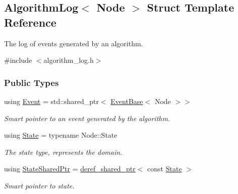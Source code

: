 \hypertarget{structAlgorithmLog}{}\subsection{Algorithm\+Log$<$ Node $>$ Struct Template Reference}
\label{structAlgorithmLog}


The log of events generated by an algorithm.  




{\ttfamily \#include $<$algorithm\+\_\+log.\+h$>$}

\subsubsection*{Public Types}
\begin{DoxyCompactItemize}
\item 
using \hyperlink{structAlgorithmLog_a7e0d48b82e3a6cbe4128c08f936fee9a}{Event} = std\+::shared\+\_\+ptr$<$ \hyperlink{structEventBase}{Event\+Base}$<$ Node $>$$>$\hypertarget{structAlgorithmLog_a7e0d48b82e3a6cbe4128c08f936fee9a}{}\label{structAlgorithmLog_a7e0d48b82e3a6cbe4128c08f936fee9a}

\begin{DoxyCompactList}\small\item\em Smart pointer to an event generated by the algorithm. \end{DoxyCompactList}\item 
using \hyperlink{structAlgorithmLog_a64e28cd23a6e61e991d6826c7c0fe466}{State} = typename Node\+::\+State\hypertarget{structAlgorithmLog_a64e28cd23a6e61e991d6826c7c0fe466}{}\label{structAlgorithmLog_a64e28cd23a6e61e991d6826c7c0fe466}

\begin{DoxyCompactList}\small\item\em The state type, represents the domain. \end{DoxyCompactList}\item 
using \hyperlink{structAlgorithmLog_aa938278830c04450a447beb9ff249b3f}{State\+Shared\+Ptr} = \hyperlink{classderef__shared__ptr}{deref\+\_\+shared\+\_\+ptr}$<$ const \hyperlink{structAlgorithmLog_a64e28cd23a6e61e991d6826c7c0fe466}{State} $>$\hypertarget{structAlgorithmLog_aa938278830c04450a447beb9ff249b3f}{}\label{structAlgorithmLog_aa938278830c04450a447beb9ff249b3f}

\begin{DoxyCompactList}\small\item\em Smart pointer to state. \end{DoxyCompactList}\end{DoxyCompactItemize}
